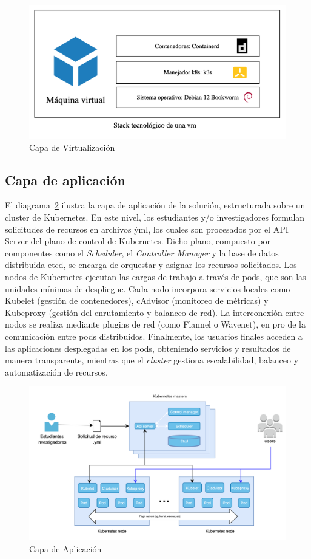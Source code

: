 \begin{figure}[H]
    \centering
    \includegraphics[width=\textwidth]{tablas-images/cp6/disenio-N2-B.png}
    \caption{Capa de Virtualización}\label{fig:virtualizacion}
\end{figure}

\subsection{Capa de aplicación}
\noindent
El diagrama~\ref{fig:aplicacion} ilustra la capa de aplicación de la solución, estructurada sobre un cluster de Kubernetes. En este nivel, los estudiantes y/o investigadores formulan solicitudes de recursos en archivos \.yml, los cuales son procesados por el API Server del plano de control de Kubernetes. Dicho plano, compuesto por componentes como el \textit{Scheduler}, el \textit{Controller Manager} y la base de datos distribuida etcd, se encarga de orquestar y asignar los recursos solicitados.
Los nodos de Kubernetes ejecutan las cargas de trabajo a través de pods, que son las unidades mínimas de despliegue. Cada nodo incorpora servicios locales como Kubelet (gestión de contenedores), cAdvisor (monitoreo de métricas) y Kubeproxy (gestión del enrutamiento y balanceo de red). La interconexión entre nodos se realiza mediante plugins de red (como Flannel o Wavenet), en pro de la comunicación entre pods distribuidos.
Finalmente, los usuarios finales acceden a las aplicaciones desplegadas en los pods, obteniendo servicios y resultados de manera transparente, mientras que el \textit{cluster} gestiona escalabilidad, balanceo y automatización de recursos.
\begin{figure}[H]
    \centering
    \includegraphics[width=\textwidth]{tablas-images/cp6/disenio-N3.png}
    \caption{Capa de Aplicación}\label{fig:aplicacion}
\end{figure}

